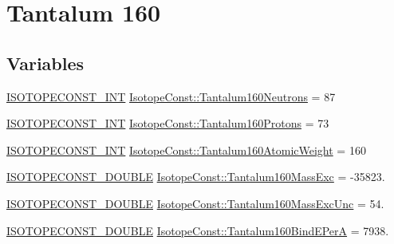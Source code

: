 \hypertarget{group___isotope_const-_tantalum-_ta160}{}\section{Tantalum 160}
\label{group___isotope_const-_tantalum-_ta160}
\subsection*{Variables}
\begin{DoxyCompactItemize}
\item 
\mbox{\hyperlink{group___isotope_const-_macros_ga5f18360b3e99483a35c32d789e62621c}{I\+S\+O\+T\+O\+P\+E\+C\+O\+N\+S\+T\+\_\+\+I\+NT}} \mbox{\hyperlink{group___isotope_const-_tantalum-_ta160_gac531b811e9a37f94fcaf28eed8a51145}{Isotope\+Const\+::\+Tantalum160\+Neutrons}} = 87
\item 
\mbox{\hyperlink{group___isotope_const-_macros_ga5f18360b3e99483a35c32d789e62621c}{I\+S\+O\+T\+O\+P\+E\+C\+O\+N\+S\+T\+\_\+\+I\+NT}} \mbox{\hyperlink{group___isotope_const-_tantalum-_ta160_gacb272b4b3778a7ae8bcd49206cea97aa}{Isotope\+Const\+::\+Tantalum160\+Protons}} = 73
\item 
\mbox{\hyperlink{group___isotope_const-_macros_ga5f18360b3e99483a35c32d789e62621c}{I\+S\+O\+T\+O\+P\+E\+C\+O\+N\+S\+T\+\_\+\+I\+NT}} \mbox{\hyperlink{group___isotope_const-_tantalum-_ta160_ga7d9fa377ff62fb619ed4c28f9bd38533}{Isotope\+Const\+::\+Tantalum160\+Atomic\+Weight}} = 160
\item 
\mbox{\hyperlink{group___isotope_const-_macros_ga8f45a7272ce02c0b4c65c44636ed719a}{I\+S\+O\+T\+O\+P\+E\+C\+O\+N\+S\+T\+\_\+\+D\+O\+U\+B\+LE}} \mbox{\hyperlink{group___isotope_const-_tantalum-_ta160_ga729d883ff11a773b4988c0560253c461}{Isotope\+Const\+::\+Tantalum160\+Mass\+Exc}} = -\/35823.
\item 
\mbox{\hyperlink{group___isotope_const-_macros_ga8f45a7272ce02c0b4c65c44636ed719a}{I\+S\+O\+T\+O\+P\+E\+C\+O\+N\+S\+T\+\_\+\+D\+O\+U\+B\+LE}} \mbox{\hyperlink{group___isotope_const-_tantalum-_ta160_gae3861b8db82b07e62fa2e7e9d487a0f5}{Isotope\+Const\+::\+Tantalum160\+Mass\+Exc\+Unc}} = 54.
\item 
\mbox{\hyperlink{group___isotope_const-_macros_ga8f45a7272ce02c0b4c65c44636ed719a}{I\+S\+O\+T\+O\+P\+E\+C\+O\+N\+S\+T\+\_\+\+D\+O\+U\+B\+LE}} \mbox{\hyperlink{group___isotope_const-_tantalum-_ta160_gabaecdcc0349f7a7334489b3a0b273d08}{Isotope\+Const\+::\+Tantalum160\+Bind\+E\+PerA}} = 7938.
\item 

\end{DoxyCompactItemize}
